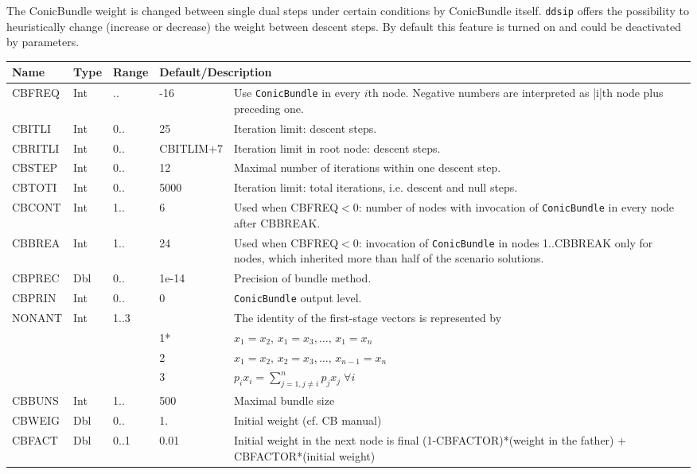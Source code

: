 \documentclass[11pt,draft]{article}
\newcommand{\+}{{\ti{+}}}
\newcommand{\1}{{\ti{1}}}
\begin{document}
The ConicBundle weight is changed between single dual steps under certain conditions by ConicBundle itself.
\texttt{ddsip} offers the possibility to heuristically change (increase or decrease) the weight between descent steps.
By default this feature is turned on and could be deactivated by parameters.

\begin{center}
\begin{tabular}{|llllp{6.6cm}|} 
\hline
Name&Type&Range&\multicolumn{2}{l|}{Default/Description}\\ \hline
CBFREQ&Int&..&-16&Use \texttt{ConicBundle} in every $i$th node. Negative numbers are interpreted as |i|th node plus preceding one.\medskip\\
CBITLI&Int&0..&25&Iteration limit: descent steps.\medskip\\
CBRITLI&Int&0..&{\footnotesize CBITLIM+7}&Iteration limit in root node: descent steps.\medskip\\
CBSTEP&Int&0..&12&Maximal number of iterations within one descent step.\medskip\\
CBTOTI&Int&0..&5000&Iteration limit: total iterations, i.e. descent and null steps.\medskip\\
CBCONT &Int&1..&6&Used when CBFREQ$<$0: number of nodes with invocation of \texttt{ConicBundle} in every node after CBBREAK.\medskip\\
CBBREA &Int&1..&24&Used when CBFREQ$<$0: invocation of \texttt{ConicBundle} in nodes 1..CBBREAK only for nodes, which inherited more than half of the scenario solutions.\medskip\\
CBPREC&Dbl&0..&1e-14&Precision of bundle method.\medskip\\
CBPRIN&Int&0..&0&\texttt{ConicBundle} output level.\medskip\\
NONANT&Int&1..3&& The identity of the first-stage vectors is represented
by \\
&&&1*&$x_1 = x_2,\, x_1 = x_3,\ldots,\, x_1 = x_n$\\
&&&2& $x_1 = x_2,\, x_2 = x_3,\ldots,\, x_{n-1} = x_n$\\
&&&3& $p_ix_i = \sum_{j=1,j \ne i}^n p_jx_j \; \forall i$\medskip\\ 
CBBUNS &Int&1..&500&Maximal bundle size\medskip\\ 
CBWEIG &Dbl&0..&1.&Initial weight (cf. CB manual)\\
CBFACT &Dbl&0..1&0.01&Initial weight in the next node is final (1-CBFACTOR)*(weight in the father) + CBFACTOR*(initial weight)\\

\end{tabular}
\end{center}
\end{document}
